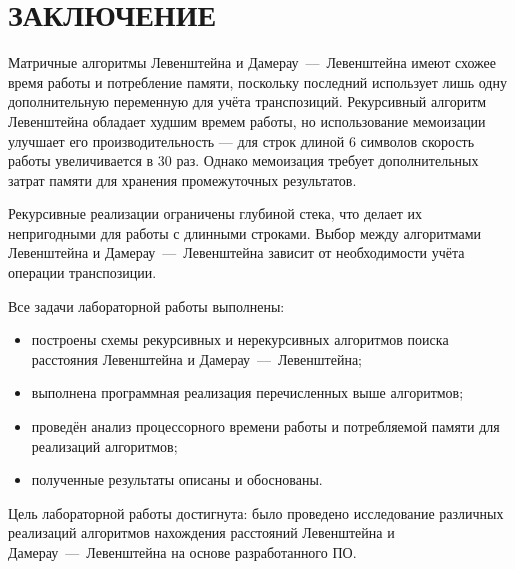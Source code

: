 \chapter*{ЗАКЛЮЧЕНИЕ}

Матричные алгоритмы Левенштейна и Дамерау~–--~Левенштейна имеют схожее время работы и потребление памяти, поскольку последний использует лишь одну дополнительную переменную для учёта транспозиций. Рекурсивный алгоритм Левенштейна обладает худшим времем работы, но использование мемоизации улучшает его производительность --- для строк длиной 6 символов скорость работы увеличивается в 30 раз. Однако мемоизация требует дополнительных затрат памяти для хранения промежуточных результатов.

Рекурсивные реализации ограничены глубиной стека, что делает их непригодными для работы с длинными строками. Выбор между алгоритмами Левенштейна и Дамерау~---~Левенштейна зависит от необходимости учёта операции транспозиции.

Все задачи лабораторной работы выполнены: 

\begin{itemize}[label=--]
	\item построены схемы рекурсивных и нерекурсивных алгоритмов поиска расстояния Левенштейна и Дамерау~---~Левенштейна;
	\item выполнена программная реализация перечисленных выше алгоритмов;
	\item проведён анализ процессорного времени работы и потребляемой памяти для реализаций алгоритмов;
        \item полученные результаты описаны и обоснованы.
\end{itemize}

Цель лабораторной работы достигнута: было проведено исследование различных реализаций алгоритмов нахождения расстояний Левенштейна и Дамерау~---~Левенштейна на основе разработанного ПО. 
